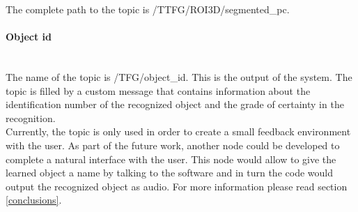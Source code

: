 		The complete path to the topic is /TTFG/ROI3D/segmented\_pc.


	\paragraph{Object id}\mbox{} \\

		The name of the topic is /TFG/object\_id. This is the output of the system. The topic is filled by a custom message that contains information about the identification number of the recognized object and the grade of certainty in the recognition.\\

		Currently, the topic is only used in order to create a small feedback environment with the user. As part of the future work, another node could be developed to complete a natural interface with the user. This node would allow to give the learned object a name by talking to the software and in turn the code would output the recognized object as audio. For more information please read section \ref{conclusions}.